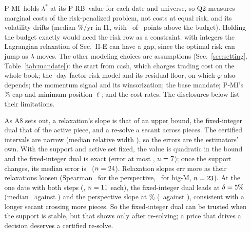 \documentclass[conference]{IEEEtran}
\newcommand{\pmi}{\mbox{P-MI}}
\newcommand{\prb}{\mbox{P-RB}}
\begin{document}
\pmi\ holds $\lambda^*$ at its \prb\ value for each date and universe, so Q2 measures marginal costs of the risk-penalized problem, not costs at equal risk, and its volatility drifts (median \VolIOneMed\%/yr in I1, with \VolIOneAbove\ of \VolIOneN\ points above the budget). Holding the budget exactly would need the risk row as a constraint: with integers the Lagrangian relaxation of Sec.~II-E can have a gap, since the optimal risk can jump as $\lambda$ moves. The other modeling choices are assumptions (Sec.~\ref{sec:setting}, Table~\ref{tab:mandate}): the start from cash, which charges trading cost on the whole book; the \RiskWindow-day factor risk model and its residual floor, on which $\varphi$ also depends; the momentum signal and its winsorization; the base mandate; \pmi's \MiqpPositionPct\% cap and minimum position $\ell$; and the cost rates. The disclosures below list their limitations.

As A8 sets out, a relaxation's slope is that of an upper bound, the fixed-integer dual that of the active piece, and a re-solve a secant across pieces. The certified intervals are narrow (median relative width \WidthMed), so the errors are the estimators' own. With the support and active set fixed, the value is quadratic in the bound and the fixed-integer dual is exact (error at most \PredOneMax, $n=7$); once the support changes, its median error is \PredThreeMed\ ($n=24$). Relaxation slopes err more as their relaxations loosen (Spearman \SpearmanPersp\ for the perspective, \SpearmanBigM\ for big-M, $n=23$). At the one date with both steps (\IOneRobustDate, $n=11$ each), the fixed-integer dual leads at $\delta=5\%$ (median \RobustFixedFive\ against \RobustPerspFive) and the perspective slope at \IOneDeltaPct\% (\RobustPerspTen\ against \RobustFixedTen), consistent with a longer secant crossing more pieces. So the fixed-integer dual can be trusted when the support is stable, but that shows only after re-solving; a price that drives a decision deserves a certified re-solve.
\end{document}

